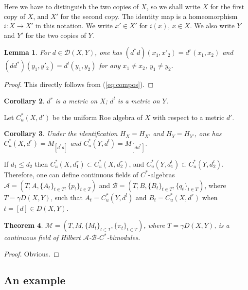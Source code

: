 \documentclass[12pt]{amsart}
\newtheorem{thm}{Theorem}[section]
\newtheorem{lem}[thm]{Lemma}
\newtheorem{cor}[thm]{Corollary}
\theoremstyle{definition}
\begin{document}
Here we have to distinguish the two copies of $X$, so we shall write $X$ for the first copy of $X$, and $X'$ for the second copy. The identity map is a homeomorphism $i:X\to X'$ in this notation. We write $x'\in X'$ for $i(x)$, $x\in X$. We also write $Y$ and $Y'$ for the two copies of $Y$.

\begin{lem}
For $d\in\mathcal D(X,Y)$, one has $(d^*d)(x_1,x'_2)=d^r(x_1,x_2)$ and $(dd^*)(y_1,y'_2)=d^l(y_1,y_2)$ for any $x_1\neq x_2$, $y_1\neq y_2$.

\end{lem}
\begin{proof}
This directly follows from (\ref{eq:compos}).
\end{proof} 

\begin{cor}
$d^r$ is a metric on $X$; $d^l$ is a metric on $Y$.

\end{cor}

Let $C^*_u(X,d')$ be the uniform Roe algebra of $X$ with respect to a metric $d'$.

\begin{cor}
Under the identification $H_X=H_{X'}$ and $H_Y=H_{Y'}$, one has $C^*_u(X,d^r)= M_{[d^*d]}$ and $C^*_u(Y,d^l)=M_{[dd^*]}$.

\end{cor} 

If $d_1\leq d_2$ then $C^*_u(X,d_1^r)\subset C^*_u(X,d_2^r)$, and $C^*_u(Y,d_1^l)\subset C^*_u(Y,d_2^l)$. 
Therefore, one can define  continuous fields of $C^*$-algebras $\mathcal A=(T,A,\{A_t\}_{t\in T},\{p_t\}_{t\in T})$ and $\mathcal B=(T,B,\{B_t\}_{t\in T},\{q_t\}_{t\in T})$, where $T=\gamma D(X,Y)$, such that $A_t=C^*_u(Y,d^l)$ and $B_t=C^*_u(X,d^r)$ when $t=[d]\in D(X,Y)$. 


\begin{thm}
$\mathcal M=(T,M,\{M_t\}_{t\in T},\{\pi_t\}_{t\in T})$, where $T=\gamma D(X,Y)$, is a continuous field of Hilbert $\mathcal A$-$\mathcal B$-$C^*$-bimodules. 

\end{thm}
\begin{proof}
Obvious.
\end{proof}
    
\subsection{An example}
\end{document}
